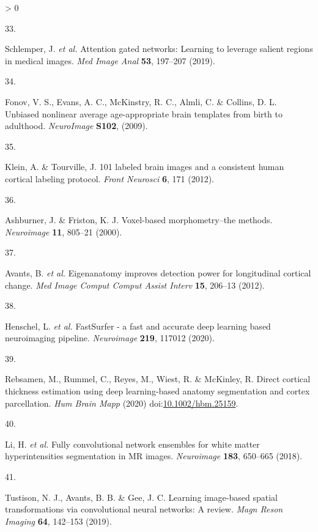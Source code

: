 \documentclass[
  12pt,
]{article}
\newlength{\cslhangindent}
\newlength{\csllabelwidth}
\newenvironment{CSLReferences}[3] %
 {%
  \setlength{\parindent}{0pt}
  \ifodd #1 \everypar{\setlength{\hangindent}{\cslhangindent}}\ignorespaces\fi
  \ifnum #2 > 0
  \setlength{\parskip}{#3\baselineskip}
  \fi
 }%
 {}
\newcommand{\CSLLeftMargin}[1]{\parbox[t]{\maxof{\widthof{#1}}{\csllabelwidth}}{#1}}
\newcommand{\CSLRightInline}[1]{\parbox[t]{\linewidth}{#1}}
\begin{document}
\begin{CSLReferences}{0}{0}
\leavevmode\hypertarget{ref-Schlemper:2019aa}{}%
\CSLLeftMargin{33. }
\CSLRightInline{Schlemper, J. \emph{et al.} Attention gated networks:
Learning to leverage salient regions in medical images. \emph{Med Image
Anal} \textbf{53}, 197--207 (2019).}

\leavevmode\hypertarget{ref-Fonov:2009aa}{}%
\CSLLeftMargin{34. }
\CSLRightInline{Fonov, V. S., Evans, A. C., McKinstry, R. C., Almli, C.
\& Collins, D. L. Unbiased nonlinear average age-appropriate brain
templates from birth to adulthood. \emph{NeuroImage} \textbf{S102},
(2009).}

\leavevmode\hypertarget{ref-Klein:2012aa}{}%
\CSLLeftMargin{35. }
\CSLRightInline{Klein, A. \& Tourville, J. 101 labeled brain images and
a consistent human cortical labeling protocol. \emph{Front Neurosci}
\textbf{6}, 171 (2012).}

\leavevmode\hypertarget{ref-Ashburner:2000aa}{}%
\CSLLeftMargin{36. }
\CSLRightInline{Ashburner, J. \& Friston, K. J. Voxel-based
morphometry--the methods. \emph{Neuroimage} \textbf{11}, 805--21
(2000).}

\leavevmode\hypertarget{ref-Avants:2012aa}{}%
\CSLLeftMargin{37. }
\CSLRightInline{Avants, B. \emph{et al.} Eigenanatomy improves detection
power for longitudinal cortical change. \emph{Med Image Comput Comput
Assist Interv} \textbf{15}, 206--13 (2012).}

\leavevmode\hypertarget{ref-Henschel:2020aa}{}%
\CSLLeftMargin{38. }
\CSLRightInline{Henschel, L. \emph{et al.} FastSurfer - a fast and
accurate deep learning based neuroimaging pipeline. \emph{Neuroimage}
\textbf{219}, 117012 (2020).}

\leavevmode\hypertarget{ref-Rebsamen:2020aa}{}%
\CSLLeftMargin{39. }
\CSLRightInline{Rebsamen, M., Rummel, C., Reyes, M., Wiest, R. \&
McKinley, R. Direct cortical thickness estimation using deep
learning-based anatomy segmentation and cortex parcellation. \emph{Hum
Brain Mapp} (2020)
doi:\href{https://doi.org/10.1002/hbm.25159}{10.1002/hbm.25159}.}

\leavevmode\hypertarget{ref-Li:2018aa}{}%
\CSLLeftMargin{40. }
\CSLRightInline{Li, H. \emph{et al.} Fully convolutional network
ensembles for white matter hyperintensities segmentation in MR images.
\emph{Neuroimage} \textbf{183}, 650--665 (2018).}

\leavevmode\hypertarget{ref-Tustison:2019ab}{}%
\CSLLeftMargin{41. }
\CSLRightInline{Tustison, N. J., Avants, B. B. \& Gee, J. C. Learning
image-based spatial transformations via convolutional neural networks: A
review. \emph{Magn Reson Imaging} \textbf{64}, 142--153 (2019).}


\end{CSLReferences}
\end{document}

